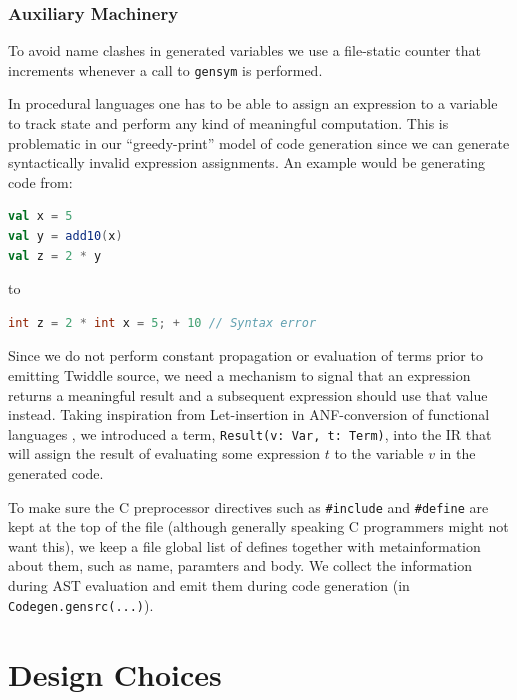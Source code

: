 \documentclass{article}
\begin{document}
\subsubsection{Auxiliary Machinery}
To avoid name clashes in generated variables we use a file-static counter that increments whenever a call to \texttt{gensym} is performed.

In procedural languages one has to be able to assign an expression to a variable to track state and perform any kind of meaningful computation. This is problematic in our ``greedy-print'' model of code generation since we can generate syntactically invalid expression assignments. An example would be generating code from:
\begin{lstlisting}[language=Scala]
val x = 5
val y = add10(x)
val z = 2 * y
\end{lstlisting}
to
\begin{lstlisting}[language=C]
int z = 2 * int x = 5; + 10 // Syntax error
\end{lstlisting} Since we do not perform constant propagation or evaluation of terms prior to emitting Twiddle source, we need a mechanism to signal that an expression returns a meaningful result and a subsequent expression should use that value instead. Taking inspiration from Let-insertion in ANF-conversion of functional languages \cite{sabry1993reasoning}, we introduced a term, \texttt{Result(v: Var, t: Term)}, into the IR that will assign the result of evaluating some expression $t$ to the variable $v$ in the generated code.


To make sure the C preprocessor directives such as \texttt{\#include} and \texttt{\#define} are kept at the top of the file (although generally speaking C programmers might not want this), we keep a file global list of defines together with metainformation about them, such as name, paramters and body. We collect the information during AST evaluation and emit them
during code generation (in \texttt{Codegen.gensrc(...)}).
\section{Design Choices}
\end{document}
